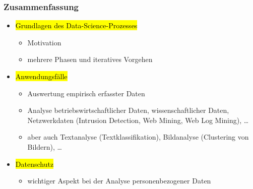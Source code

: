 
\begin{frame}
\frametitle{Zusammenfassung}

\begin{itemize}
\item \hl{Grundlagen des Data-Science-Prozesses}
\begin{itemize}
\item Motivation
\item mehrere Phasen und iteratives Vorgehen
\end{itemize}
\item \hl{Anwendungsfälle}
\begin{itemize}
\item Auswertung empirisch erfasster Daten
\item Analyse betriebswirtschaftlicher Daten, wissenschaftlicher
  Daten, Netzwerkdaten (Intrusion Detection, Web Mining, Web Log
  Mining), \dots
\item aber auch Textanalyse (Textklassifikation), Bildanalyse
  (Clustering von Bildern), \dots
\end{itemize}
\item \hl{Datenschutz}
\begin{itemize}
\item wichtiger Aspekt bei der Analyse personenbezogener Daten
\end{itemize}
\end{itemize}

\end{frame}



